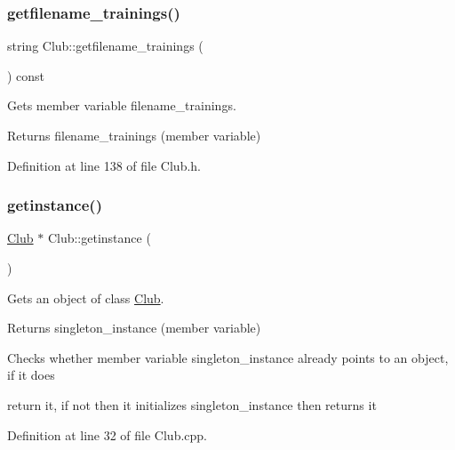 \subsubsection{\texorpdfstring{getfilename\+\_\+trainings()}{getfilename\_trainings()}}
{\footnotesize\ttfamily string Club\+::getfilename\+\_\+trainings (\begin{DoxyParamCaption}{ }\end{DoxyParamCaption}) const\hspace{0.3cm}{\ttfamily [inline]}}



Gets member variable filename\+\_\+trainings. 

\begin{DoxyReturn}{Returns}
filename\+\_\+trainings (member variable) 
\end{DoxyReturn}


Definition at line 138 of file Club.\+h.

\hypertarget{class_club_aefc364f93d7b49202fe8fa35c01da4cf}{}\label{class_club_aefc364f93d7b49202fe8fa35c01da4cf} 
\subsubsection{\texorpdfstring{getinstance()}{getinstance()}}
{\footnotesize\ttfamily \hyperlink{class_club}{Club} $\ast$ Club\+::getinstance (\begin{DoxyParamCaption}{ }\end{DoxyParamCaption})\hspace{0.3cm}{\ttfamily [static]}}



Gets an object of class \hyperlink{class_club}{Club}. 

\begin{DoxyReturn}{Returns}
singleton\+\_\+instance (member variable)
\end{DoxyReturn}
Checks whether member variable singleton\+\_\+instance already points to an object, if it does

return it, if not then it initializes singleton\+\_\+instance then returns it 

Definition at line 32 of file Club.\+cpp.

\hypertarget{class_club_a08eeadedcdbf4cfd5eaada3066b668dd}{}\label{class_club_a08eeadedcdbf4cfd5eaada3066b668dd} 
